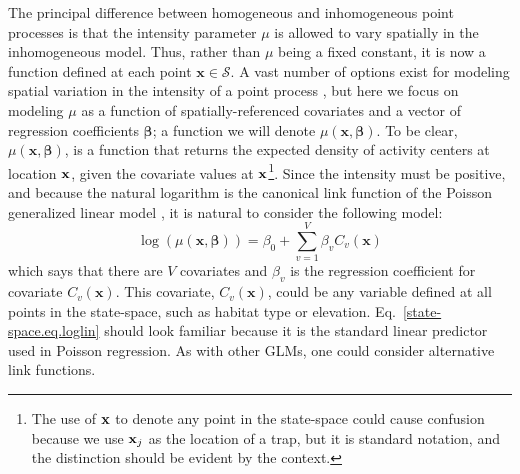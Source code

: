The principal difference between homogeneous and inhomogeneous point
processes is that the intensity parameter $\mu$ is allowed to vary spatially
in the inhomogeneous model. Thus, rather than $\mu$ being a fixed constant,
it is now a function defined at each point $\mathbf{x} \in
\mathcal{S}$. A vast number of options exist for modeling spatial
variation in the intensity of a point process
\citep{cox:1955,stoyan_penttinen:2000,illian_etal:2008}, but here we
focus on modeling $\mu$ as a function of
spatially-referenced covariates and a vector of regression
coefficients $\bm \beta$; a function we will denote $\mu(\mathbf{x},
\bm{\beta})$. To be clear, $\mu(\mathbf{x}, \bm{\beta})$, is a
function that returns the expected density of activity centers at
location $\bf x$, given the covariate values at
$\bf x$\footnote{The use of $\bf x$ to denote any point in the state-space
could cause confusion because we use ${\bf x}_j$ as the location of a
trap, but it is standard notation, and the distinction should be
evident by the context.}.
Since the
intensity must be positive, and because the natural logarithm is the
canonical link function of the Poisson generalized linear model
\citep{mccullagh_nelder:1989}, it is natural to consider the following model:
\begin{equation}
  \log(\mu(\mathbf{x}, {\bm \beta})) = \beta_0 + \sum_{v=1}^V \beta_v C_v(\mathbf{x})%
  \label{state-space.eq.loglin}
\end{equation}
which says that there are $V$ covariates and $\beta_v$ is the
regression coefficient for covariate $C_v(\mathbf{x})$. This
covariate, $C_v(\mathbf{x})$, could be any variable defined at all points
in the state-space, such as habitat type or elevation.
Eq.~\ref{state-space.eq.loglin} should look familiar because it is the
standard linear predictor used in Poisson regression. As with other
GLMs, one could consider alternative link functions.

